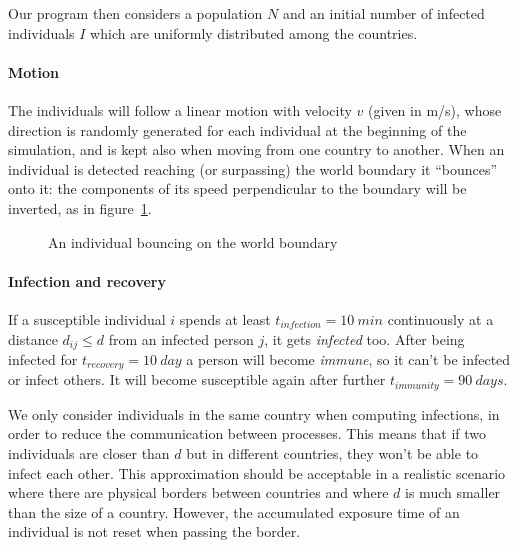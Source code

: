 \noindent
Our program then considers a population $N$ and an initial number of infected individuals $I$ which are uniformly distributed among the countries.

\paragraph{Motion}
The individuals will follow a linear motion with velocity $v$ (given in \si{m/s}), whose direction is randomly generated for each individual at the beginning of the simulation, and is kept also when moving from one country to another. When an individual is detected reaching (or surpassing) the world boundary it “bounces” onto it: the components of its speed perpendicular to the boundary will be inverted, as in figure~\ref{fig:boundary_bounce}.

\begin{figure}[h]
    \centering
    \caption{An individual bouncing on the world boundary}
    \label{fig:boundary_bounce}
\end{figure}

\paragraph{Infection and recovery}
If a susceptible individual $i$ spends at least $t_{infection} = \SI{10}{min}$ continuously at a distance $d_{ij}\leq d$ from an infected person $j$, it gets \emph{infected} too.
After being infected for $t_{recovery} = \SI{10}{day}$ a person will become \emph{immune}, so it can't be infected or infect others. It will become susceptible again after further $t_{immunity} = \SI{90}{days}$.

We only consider individuals in the same country when computing infections, in order to reduce the communication between processes. This means that if two individuals are closer than $d$ but in different countries, they won't be able to infect each other. This approximation should be acceptable in a realistic scenario where there are physical borders between countries and where $d$ is much smaller than the size of a country. However, the accumulated exposure time of an individual is not reset when passing the border.

